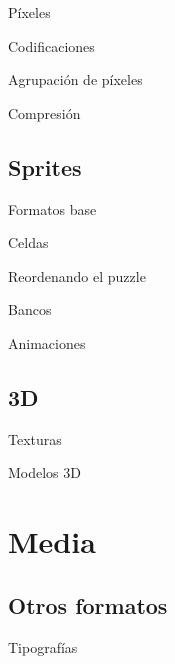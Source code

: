 \begin{frame}{Píxeles}
\end{frame}

\begin{frame}{Codificaciones}
\end{frame}

\begin{frame}{Agrupación de píxeles}
\end{frame}

\begin{frame}{Compresión}
\end{frame}

\subsection{Sprites}
\begin{frame}{Formatos base}
\end{frame}

\begin{frame}{Celdas}
\end{frame}

\begin{frame}{Reordenando el puzzle}
\end{frame}

\begin{frame}{Bancos}
\end{frame}

\begin{frame}{Animaciones}
\end{frame}

\subsection{3D}
\begin{frame}{Texturas}
\end{frame}

\begin{frame}{Modelos 3D}
\end{frame}

\section{Media}
\subsection{Otros formatos}
\begin{frame}{Tipografías}
\end{frame}

